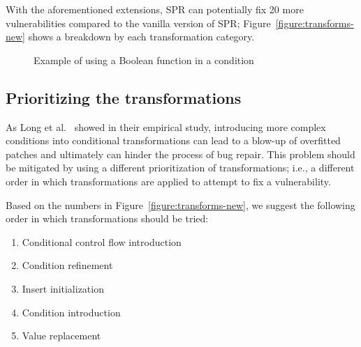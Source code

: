 With the aforementioned extensions, SPR can potentially fix 20 more vulnerabilities compared to the vanilla version of SPR; Figure~\ref{figure:transforms-new} shows a breakdown by each transformation category.

\begin{figure}



\vspace{0.1in}
\small \caption{Example of using a Boolean function in a condition}
    \label{figure:new-ccfi}
\vspace{-0.2in}
\end{figure}

\subsection{Prioritizing the transformations}

As Long et al.~\cite{long2016analysis} showed in their empirical study, introducing more complex conditions into conditional transformations can lead to a blow-up of overfitted patches and ultimately can hinder the process of bug repair. This problem should be mitigated by using a different prioritization of transformations; i.e., a different order in which transformations are applied to attempt to fix a vulnerability.

Based on the numbers in Figure~\ref{figure:transforms-new}, we suggest the following order in which transformations should be tried:
\begin{enumerate}
    \item Conditional control flow introduction
    \item Condition refinement
    \item Insert initialization
    \item Condition introduction
    \item Value replacement
\end{enumerate}
